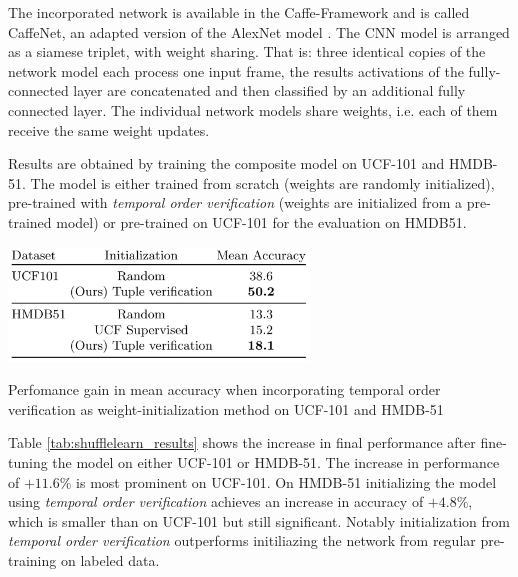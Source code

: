 The incorporated network is available in the Caffe-Framework \cite{jia_caffe:_2014-1} and is called CaffeNet, an adapted version of the AlexNet model \cite{krizhevsky_imagenet_2012-1}.
The CNN model is arranged as a siamese triplet, with weight sharing.
That is: three identical copies of the network model each process one input frame, the results activations of the fully-connected layer are concatenated and then classified by an additional fully connected layer.
The individual network models share weights, i.e. each of them receive the same weight updates.

Results are obtained by training the composite model on UCF-101 and HMDB-51.
The model is either trained from scratch (weights are randomly initialized), pre-trained with \textit{temporal order verification} (weights are initialized from a pre-trained model) or pre-trained on UCF-101 for the evaluation on HMDB51.

\begin{table}[H]
    \centering
    \includegraphics[width=0.6\textwidth]{img_related/shufflelearn_results}
    \caption{Perfomance gain in mean accuracy when incorporating temporal order verification as weight-initialization method on UCF-101 and HMDB-51 \cite{misra_shuffle_2016}}
    \label{tab:shufflelearn_results}
\end{table}

Table \ref{tab:shufflelearn_results} shows the increase in final performance after fine-tuning the model on either UCF-101 or HMDB-51.
The increase in performance of $+11.6\%$ is most prominent on UCF-101.
On HMDB-51 initializing the model using \textit{temporal order verification} achieves an increase in accuracy of $+4.8\%$, which is smaller than on UCF-101 but still significant.
Notably initialization from \textit{temporal order verification} outperforms initiliazing the network from regular pre-training on labeled data.
\bigskip


